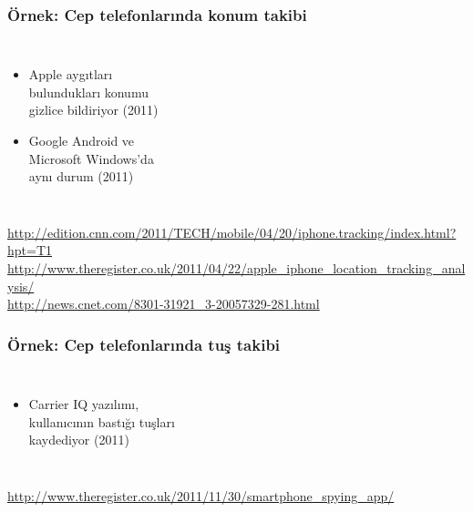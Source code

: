 \documentclass[dvipsnames]{beamer}
\theoremstyle{plain}
\begin{document}
\begin{frame}
  \frametitle{Örnek: Cep telefonlarında konum takibi}

  \begin{columns}

    \begin{itemize}
      \item Apple aygıtları\\
        bulundukları konumu\\
        gizlice bildiriyor (2011)
      \item Google Android ve\\
        Microsoft Windows'da\\
        aynı durum (2011)
    \end{itemize}
  \end{columns}

  \medskip
  \tiny{\url{http://edition.cnn.com/2011/TECH/mobile/04/20/iphone.tracking/index.html?hpt=T1}}\\
  \tiny{\url{http://www.theregister.co.uk/2011/04/22/apple_iphone_location_tracking_analysis/}}\\
  \tiny{\url{http://news.cnet.com/8301-31921_3-20057329-281.html}}\\
\end{frame}

\begin{frame}
  \frametitle{Örnek: Cep telefonlarında tuş takibi}

  \begin{columns}

    \begin{itemize}
      \item Carrier IQ yazılımı,\\
        kullanıcının bastığı tuşları\\
        kaydediyor (2011)
    \end{itemize}
  \end{columns}

  \medskip
  \tiny{\url{http://www.theregister.co.uk/2011/11/30/smartphone_spying_app/}}\\
\end{frame}
\end{document}
